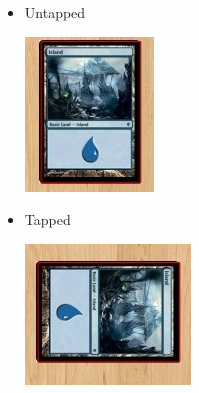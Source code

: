 \documentclass[a4paper]{scrbook}
\begin{document}
\begin{itemize}
 \item Untapped
 \begin{center}
  \includegraphics{pics/fetchb6fe}
 \end{center}

 \item Tapped
 \begin{center}
  \includegraphics{pics/fetch867f}
 \end{center}
\end{itemize}
\end{document}
